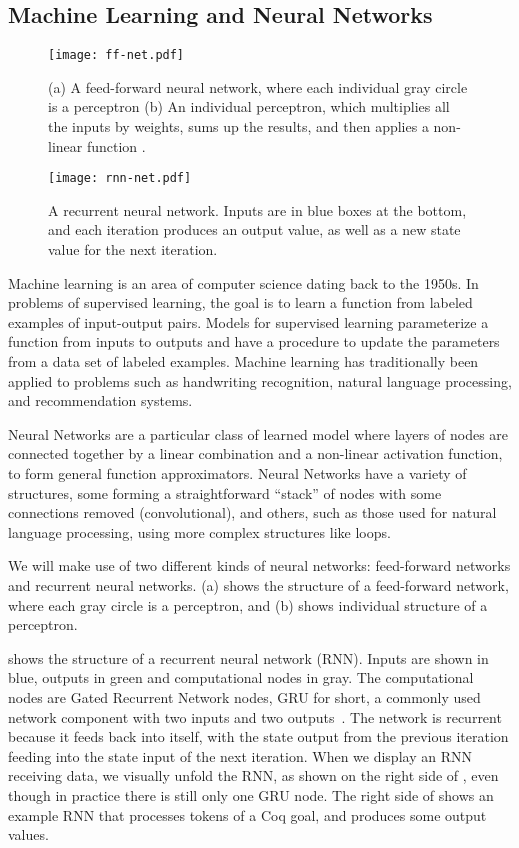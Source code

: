 \documentclass[sigplan,screen]{acmart}
\renewcommand{\>}{\quad}
\begin{document}
\subsection{Machine Learning and Neural Networks}

  \begin{figure}
    \texttt{[image: ff-net.pdf]}
    \caption{(a) A feed-forward neural network, where each individual gray circle is a
      perceptron (b) An individual perceptron, which multiplies all the inputs by weights, sums up the results, and then applies a non-linear function .}
    \label{fig:ff}
  \end{figure}

  \begin{figure}
    \texttt{[image: rnn-net.pdf]}
    \caption{A recurrent neural network. Inputs are in blue boxes at
      the bottom, and each iteration produces an output value, as well
      as a new state value for the next iteration.}
    \label{fig:rnn}
  \end{figure}
Machine learning is an area of computer science dating back to the 1950s.
In problems of supervised learning,
  the goal is to learn a function from labeled examples of input-output pairs.
Models for supervised learning
  parameterize a function from inputs to outputs
  and have a procedure to update the parameters from a data set of labeled examples.
Machine learning has traditionally been applied to problems such as
  handwriting recognition, natural language processing, and recommendation systems.

Neural Networks are a particular class of learned model
  where layers of nodes are connected together
  by a linear combination and a non-linear activation function,
  to form general function approximators.
Neural Networks have a variety of structures,
  some forming a straightforward ``stack'' of nodes
  with some connections removed (convolutional),
  and others, such as those used for natural language processing,
  using more complex structures like loops.

We will make use of two different kinds of neural networks: feed-forward networks and recurrent neural networks.
(a) shows the structure of a feed-forward network, where each gray circle is a perceptron, and (b) shows individual structure of a perceptron.

 shows the structure of a recurrent neural network (RNN). Inputs are shown in blue, outputs in green and computational nodes in gray.
The computational nodes are Gated Recurrent Network nodes,
  GRU for short,
  a commonly used network component with two inputs and two outputs~\cite{gru}.
The network is recurrent because it feeds back into itself,
  with the state output from the previous iteration
  feeding into the state input of the next iteration.
When we display an RNN receiving data, we visually unfold the RNN, as shown on the right side of , even though in practice there is still only one GRU node.
The right side of  shows an example RNN that processes tokens of a Coq goal, and produces some output values.
\end{document}
